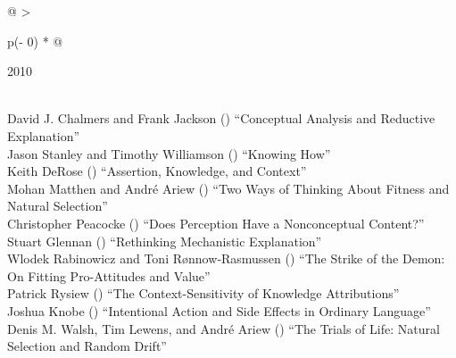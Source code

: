 \documentclass[
  10pt,
  letterpaper,
  DIV=11,
  numbers=noendperiod,
  twoside]{scrartcl}
\begin{document}
\begin{longtable}[]{@{}
  >{\raggedright\arraybackslash}p{(\columnwidth - 0\tabcolsep) * }@{}}

\caption{\label{tbl-top-ten-2001}Most cited articles published less than
ten years ago as of 2010.}

\tabularnewline

\toprule\noalign{}
\begin{minipage}[b]{\linewidth}\raggedright
2010
\end{minipage} \\
\midrule\noalign{}
\endhead
\bottomrule\noalign{}
\endlastfoot
David J. Chalmers and Frank Jackson
()
``Conceptual Analysis and Reductive Explanation'' \\
Jason Stanley and Timothy Williamson
()
``Knowing How'' \\
Keith DeRose
()
``Assertion, Knowledge, and Context'' \\
Mohan Matthen and André Ariew
()
``Two Ways of Thinking About Fitness and Natural Selection'' \\
Christopher Peacocke
()
``Does Perception Have a Nonconceptual Content?'' \\
Stuart Glennan
()
``Rethinking Mechanistic Explanation'' \\
Wlodek Rabinowicz and Toni Rønnow‐Rasmussen
()
``The Strike of the Demon: On Fitting Pro-Attitudes and Value'' \\
Patrick Rysiew
()
``The Context-Sensitivity of Knowledge Attributions'' \\
Joshua Knobe
()
``Intentional Action and Side Effects in Ordinary Language'' \\
Denis M. Walsh, Tim Lewens, and André Ariew
()
``The Trials of Life: Natural Selection and Random Drift'' \\

\end{longtable}
\end{document}
